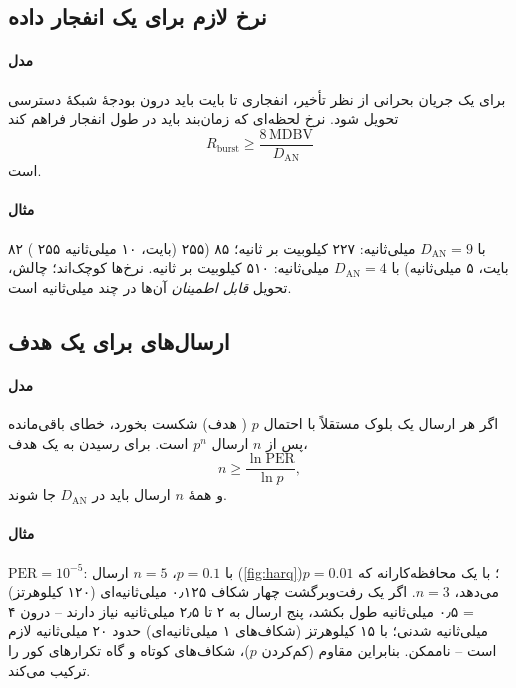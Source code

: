 \documentclass[11pt,a4paper]{article}
\begin{document}
\subsection{نرخ لازم برای یک انفجار داده}\label{sec:mdbv}
\paragraph{مدل} برای یک جریان  بحرانی از نظر تأخیر، انفجاری تا  بایت باید درون بودجهٔ شبکهٔ دسترسی تحویل شود. نرخ
لحظه‌ای که زمان‌بند باید در طول انفجار فراهم کند
\begin{equation}\label{eq:mdbv}
  R_{\mathrm{burst}} \ge \frac{8\,\mathrm{MDBV}}{D_{\mathrm{AN}}}
\end{equation}
است.
\paragraph{مثال}  ۸۲ ( ۲۵۵ بایت،  ۱۰ میلی‌ثانیه) با $D_{\mathrm{AN}} = 9$ میلی‌ثانیه: ۲۲۷ کیلوبیت بر ثانیه؛
 ۸۵ (۲۵۵ بایت،  ۵ میلی‌ثانیه) با $D_{\mathrm{AN}} = 4$ میلی‌ثانیه: ۵۱۰ کیلوبیت بر ثانیه. نرخ‌ها کوچک‌اند؛ چالش، تحویل
\emph{قابل اطمینان} آن‌ها در چند میلی‌ثانیه است.

\subsection{ارسال‌های  برای یک هدف }\label{sec:harq}
\paragraph{مدل} اگر هر ارسال یک بلوک مستقلاً با احتمال $p$ ( هدف) شکست بخورد، خطای باقی‌مانده پس از $n$ ارسال $p^n$ است. برای
رسیدن به یک  هدف،
\begin{equation}\label{eq:harq}
  n \ge \frac{\ln \mathrm{PER}}{\ln p},
\end{equation}
و همهٔ $n$ ارسال باید در $D_{\mathrm{AN}}$ جا شوند.
\paragraph{مثال} $\mathrm{PER} = 10^{-5}$: با $p = 0.1$، $n = 5$ ارسال (\cref{fig:harq})؛ با یک  محافظه‌کارانه که $p = 0.01$ می‌دهد،
$n = 3$. اگر یک رفت‌وبرگشت  چهار شکاف ۰٫۱۲۵ میلی‌ثانیه‌ای (۱۲۰ کیلوهرتز) = ۰٫۵ میلی‌ثانیه طول بکشد، پنج ارسال به ۲ تا ۲٫۵ میلی‌ثانیه
نیاز دارند -- درون ۴ میلی‌ثانیه شدنی؛ با ۱۵ کیلوهرتز (شکاف‌های ۱ میلی‌ثانیه‌ای) حدود ۲۰ میلی‌ثانیه لازم است -- ناممکن. بنابراین
  مقاوم (کم‌کردن $p$)، شکاف‌های کوتاه و گاه تکرارهای کور را ترکیب می‌کند.
\end{document}
